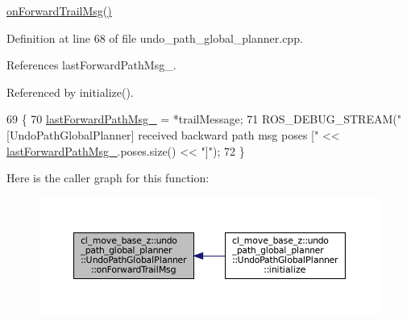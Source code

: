 \hyperlink{classcl__move__base__z_1_1undo__path__global__planner_1_1UndoPathGlobalPlanner_ae5e3c5922ceb8783a6a01d904fc9c230}{on\+Forward\+Trail\+Msg()} 

Definition at line 68 of file undo\+\_\+path\+\_\+global\+\_\+planner.\+cpp.



References last\+Forward\+Path\+Msg\+\_\+.



Referenced by initialize().


\begin{DoxyCode}
69         \{
70             \hyperlink{classcl__move__base__z_1_1undo__path__global__planner_1_1UndoPathGlobalPlanner_a9a4a6e40f5b6cb5f77dedbc5b6170871}{lastForwardPathMsg\_} = *trailMessage;
71             ROS\_DEBUG\_STREAM(\textcolor{stringliteral}{"[UndoPathGlobalPlanner] received backward path msg poses ["} << 
      \hyperlink{classcl__move__base__z_1_1undo__path__global__planner_1_1UndoPathGlobalPlanner_a9a4a6e40f5b6cb5f77dedbc5b6170871}{lastForwardPathMsg\_}.poses.size() << \textcolor{stringliteral}{"]"});
72         \}
\end{DoxyCode}
Here is the caller graph for this function\+:
\nopagebreak
\begin{figure}[H]
\begin{center}
\leavevmode
\includegraphics[width=350pt]{classcl__move__base__z_1_1undo__path__global__planner_1_1UndoPathGlobalPlanner_ae5e3c5922ceb8783a6a01d904fc9c230_icgraph}
\end{center}
\end{figure}
\mbox{\label{classcl__move__base__z_1_1undo__path__global__planner_1_1UndoPathGlobalPlanner_a37a85e1cd57173902d8302cb8cb9b933}} 
